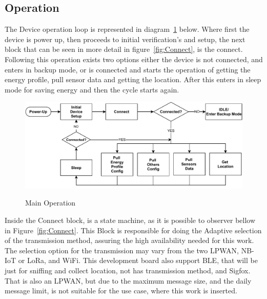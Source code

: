\subsection{Operation}
\label{susec:Operation}
The Device operation loop is represented in diagram~\ref{fig:Main_Op} below. Where first the device is power up, then proceeds to initial verification's and setup, the next block that can be seen in more detail in  figure~\ref{fig:Connect}, is the connect. Following this operation exists two options either the device is not connected, and enters in backup mode, or is connected and starts the operation of getting the energy profile, pull sensor data and getting the location. After this enters in sleep mode for saving energy and then the cycle starts again.

\begin{figure}[htbp]
  \centering
  
    {\includegraphics[width=0.8\linewidth]{Chapters/Figures/Main.pdf}}%
 
  \caption{Main Operation}
  \label{fig:Main_Op}
\end{figure}

Inside the Connect block, is a state machine, as it is possible to observer bellow in Figure~\ref{fig:Connect}. This Block is responsible for doing the Adaptive selection of the transmission method, assuring the high availability needed for this work. The selection option for the transmission may vary from the two LPWAN, NB-IoT or LoRa, and WiFi. This development board also support BLE, that will be just for sniffing and collect location, not has transmission method, and Sigfox. That is also an LPWAN, but due to the maximum message size, and the daily message limit, is not suitable for the use case, where this work is inserted.

